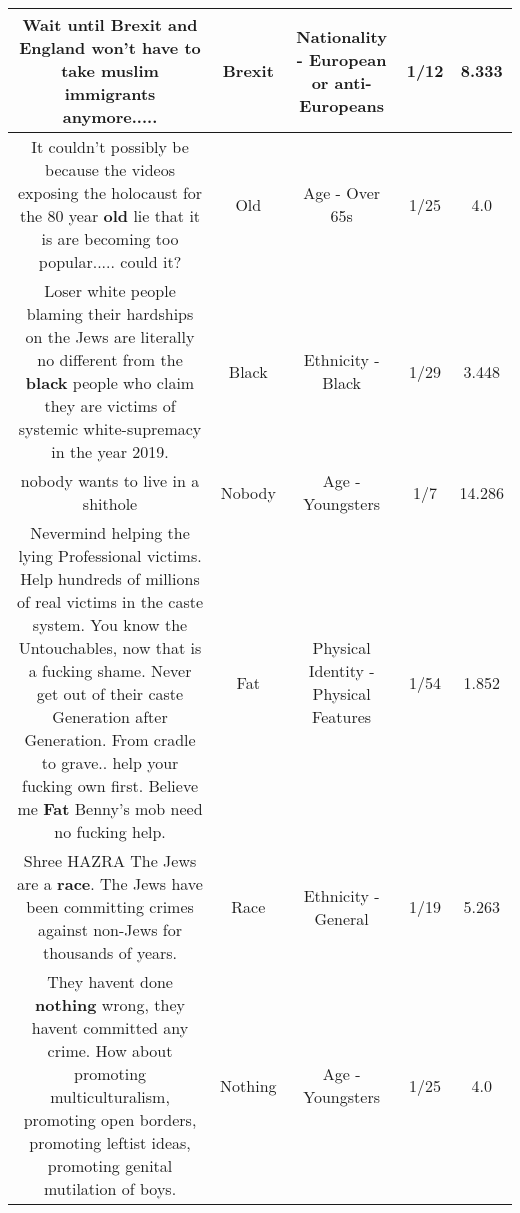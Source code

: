 \documentclass[11pt]{article}
\newlength\mylength
\begin{document}
\begin{center}
\begin{longtable}{|C{.65\mylength}|C{.30\mylength}|C{.12\mylength}|C{.12\mylength}|C{.12\mylength}|}
  \small Wait until \textbf{Brexit} and England won't have to take muslim immigrants anymore.....\normalsize   & Brexit & Nationality - European or anti-Europeans & 1/12 & 8.333 \\  \hline
  \small It couldn't possibly be because the videos exposing the holocaust for the 80 year \textbf{old} lie that it is are becoming too popular..... could it?\normalsize   & Old & Age - Over 65s & 1/25 & 4.0 \\  \hline
  \small Loser white people blaming their hardships on the Jews are literally no different from the \textbf{black} people who claim they are victims of systemic white-supremacy in the year 2019.\normalsize   & Black & Ethnicity - Black & 1/29 & 3.448 \\  \hline
  \small nobody wants to live in a shithole\normalsize   & Nobody & Age - Youngsters & 1/7 & 14.286 \\  \hline
  \small Nevermind helping the lying Professional victims.  Help hundreds of millions of real victims in the caste system. You know the Untouchables, now that is a fucking shame. Never get out of their caste Generation after Generation. From cradle to grave.. help your fucking own first. Believe me \textbf{Fat} Benny's mob need no fucking help.\normalsize   & Fat & Physical Identity - Physical Features & 1/54 & 1.852 \\  \hline
  \small Shree HAZRA The Jews are a \textbf{race}. The Jews have been committing crimes against non-Jews for thousands of years.\normalsize   & Race & Ethnicity - General & 1/19 & 5.263 \\  \hline
  \small They havent done \textbf{nothing} wrong, they havent committed any crime. How about promoting multiculturalism, promoting open borders, promoting leftist ideas, promoting genital mutilation of boys.\normalsize   & Nothing & Age - Youngsters & 1/25 & 4.0 \\  \hline

\end{longtable}
\end{center}
\end{document}
